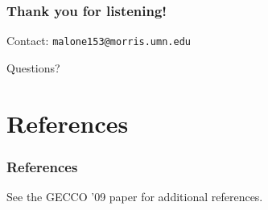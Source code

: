 \documentclass{beamer}
\newcommand{\linespace}{\vskip 0.25cm}
\begin{document}
\begin{frame}
	\frametitle{Thank you for listening!}
	
	
		
	\linespace
	\linespace
	
	Contact:  
		\texttt{malone153@morris.umn.edu}
	
	\linespace
	\linespace
	
	\begin{center}
	{\huge Questions?}
	\end{center}
\end{frame}

\section*{References}

\begin{frame} 
	\frametitle{References} 
	
	
	
	\linespace
	\begin{center}
	See the GECCO '09 paper for additional references.
	\end{center}
\end{frame} 
\end{document}
